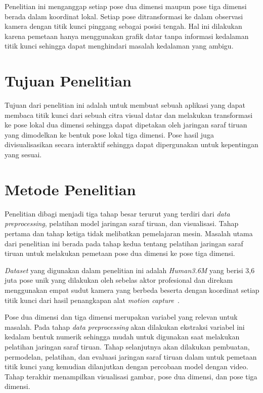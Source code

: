 Penelitian ini menganggap setiap pose dua dimensi maupun pose tiga dimensi berada dalam koordinat
lokal. Setiap pose ditransformasi ke dalam observasi kamera dengan titik kunci pinggang
sebagai posisi tengah. Hal ini dilakukan karena pemetaan hanya menggunakan grafik datar tanpa
informasi kedalaman titik kunci sehingga dapat menghindari masalah kedalaman yang ambigu.

\section{Tujuan Penelitian}
\label{sec:1-TujuanPenelitian}

Tujuan dari penelitian ini adalah untuk membuat sebuah aplikasi yang dapat membaca titik kunci dari
sebuah citra visual datar dan melakukan transformasi ke pose lokal dua dimensi sehingga dapat
dipetakan oleh jaringan saraf tiruan yang dimodelkan ke bentuk pose lokal tiga dimensi. Pose hasil
juga divisualisasikan secara interaktif sehingga dapat dipergunakan untuk kepentingan yang sesuai.

\section{Metode Penelitian}
\label{sec:1-MetodePenelitian}

Penelitian dibagi menjadi tiga tahap besar terurut yang terdiri dari \textit{data preprocessing},
pelatihan model jaringan saraf tiruan, dan visualisasi. Tahap pertama dan tahap ketiga tidak
melibatkan pemelajaran mesin. Masalah utama dari penelitian ini berada pada tahap kedua tentang
pelatihan jaringan saraf tiruan untuk melakukan pemetaan pose dua dimensi ke pose tiga dimensi.

\textit{Dataset} yang digunakan dalam penelitian ini adalah \textit{Human3.6M} yang berisi 3,6 juta
pose unik yang dilakukan oleh sebelas aktor profesional dan direkam menggunakan empat sudut kamera
yang berbeda beserta dengan koordinat setiap titik kunci dari hasil penangkapan alat
\textit{motion capture}~\cite{h36m_pami}.

Pose dua dimensi dan tiga dimensi merupakan variabel yang relevan untuk masalah. Pada tahap
\textit{data preprocessing} akan dilakukan ekstraksi variabel ini kedalam bentuk numerik sehingga
mudah untuk digunakan saat melakukan pelatihan jaringan saraf tiruan. Tahap selanjutnya akan
dilakukan pembuatan, permodelan, pelatihan, dan evaluasi jaringan saraf tiruan dalam untuk
pemetaan titik kunci yang kemudian dilanjutkan dengan percobaan model dengan video. Tahap terakhir
menampilkan visualisasi gambar, pose dua dimensi, dan pose tiga dimensi.

